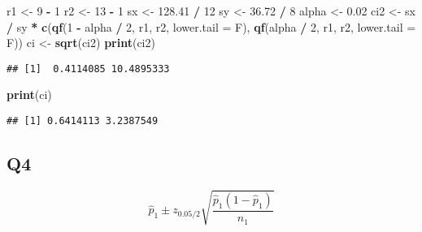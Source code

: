 \documentclass[
]{book}
\newenvironment{Shaded}{\begin{snugshade}}{\end{snugshade}}
\newcommand{\DataTypeTok}[1]{\textcolor[rgb]{0.13,0.29,0.53}{#1}}
\newcommand{\DecValTok}[1]{\textcolor[rgb]{0.00,0.00,0.81}{#1}}
\newcommand{\FloatTok}[1]{\textcolor[rgb]{0.00,0.00,0.81}{#1}}
\newcommand{\KeywordTok}[1]{\textcolor[rgb]{0.13,0.29,0.53}{\textbf{#1}}}
\newcommand{\NormalTok}[1]{#1}
\newcommand{\OperatorTok}[1]{\textcolor[rgb]{0.81,0.36,0.00}{\textbf{#1}}}
\newcommand{\StringTok}[1]{\textcolor[rgb]{0.31,0.60,0.02}{#1}}
\theoremstyle{definition}
\theoremstyle{definition}
\theoremstyle{definition}
\theoremstyle{remark}
\begin{document}
\begin{Shaded}
\begin{Highlighting}[]
\NormalTok{r1 <{-}}\StringTok{ }\DecValTok{9} \OperatorTok{{-}}\StringTok{ }\DecValTok{1}
\NormalTok{r2 <{-}}\StringTok{ }\DecValTok{13} \OperatorTok{{-}}\StringTok{ }\DecValTok{1}
\NormalTok{sx <{-}}\StringTok{ }\FloatTok{128.41} \OperatorTok{/}\StringTok{ }\DecValTok{12}
\NormalTok{sy <{-}}\StringTok{ }\FloatTok{36.72} \OperatorTok{/}\StringTok{ }\DecValTok{8}
\NormalTok{alpha <{-}}\StringTok{ }\FloatTok{0.02}
\NormalTok{ci2 <{-}}\StringTok{ }\NormalTok{sx }\OperatorTok{/}\StringTok{ }\NormalTok{sy }\OperatorTok{*}\StringTok{ }\KeywordTok{c}\NormalTok{(}\KeywordTok{qf}\NormalTok{(}\DecValTok{1} \OperatorTok{{-}}\StringTok{ }\NormalTok{alpha }\OperatorTok{/}\StringTok{ }\DecValTok{2}\NormalTok{, r1, r2, }\DataTypeTok{lower.tail =}\NormalTok{ F), }\KeywordTok{qf}\NormalTok{(alpha }\OperatorTok{/}\StringTok{ }\DecValTok{2}\NormalTok{, r1, r2, }\DataTypeTok{lower.tail =}\NormalTok{ F))}
\NormalTok{ci <{-}}\StringTok{ }\KeywordTok{sqrt}\NormalTok{(ci2)}
\KeywordTok{print}\NormalTok{(ci2)}
\end{Highlighting}
\end{Shaded}

\begin{verbatim}
## [1]  0.4114085 10.4895333
\end{verbatim}

\begin{Shaded}
\begin{Highlighting}[]
\KeywordTok{print}\NormalTok{(ci)}
\end{Highlighting}
\end{Shaded}

\begin{verbatim}
## [1] 0.6414113 3.2387549
\end{verbatim}

\hypertarget{q4-1}{%
\subsection{Q4}\label{q4-1}}

\[
\hat{p}_{1} \pm z_{0.05 / 2} \sqrt{\frac{\hat{p}_{1}\left(1-\hat{p}_{1}\right)}{n_{1}}}
\]
\end{document}

